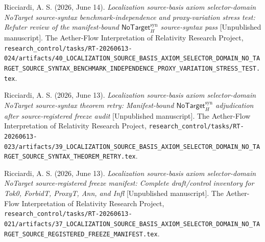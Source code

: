 \documentclass[11pt]{article}
\newcommand{\NoTargetSyn}{\mathsf{NoTarget}_{H}^{\mathrm{syn}}}
\begin{document}
Ricciardi, A. S. (2026, June 14). \emph{Localization source-basis axiom
selector-domain NoTarget source-syntax benchmark-independence and
proxy-variation stress test: Refuter review of the manifest-bound
\(\NoTargetSyn\) source-syntax pass} [Unpublished manuscript]. The
Aether-Flow Interpretation of Relativity Research Project,
\texttt{research\_control/tasks/RT-20260613-024/artifacts/40\_LOCALIZATION\_SOURCE\_BASIS\_AXIOM\_SELECTOR\_DOMAIN\_NO\_TARGET\_SOURCE\_SYNTAX\_BENCHMARK\_INDEPENDENCE\_PROXY\_VARIATION\_STRESS\_TEST.tex}.

Ricciardi, A. S. (2026, June 13). \emph{Localization source-basis axiom
selector-domain NoTarget source-syntax theorem retry: Manifest-bound
\(\NoTargetSyn\) adjudication after source-registered freeze audit}
[Unpublished manuscript]. The Aether-Flow Interpretation of Relativity
Research Project,
\texttt{research\_control/tasks/RT-20260613-023/artifacts/39\_LOCALIZATION\_SOURCE\_BASIS\_AXIOM\_SELECTOR\_DOMAIN\_NO\_TARGET\_SOURCE\_SYNTAX\_THEOREM\_RETRY.tex}.

Ricciardi, A. S. (2026, June 13). \emph{Localization source-basis axiom
selector-domain NoTarget source-registered freeze manifest: Complete
draft/control inventory for Tok0, ForbidT, ProxyT, Ann, and Infl}
[Unpublished manuscript]. The Aether-Flow Interpretation of Relativity
Research Project,
\texttt{research\_control/tasks/RT-20260613-021/artifacts/37\_LOCALIZATION\_SOURCE\_BASIS\_AXIOM\_SELECTOR\_DOMAIN\_NO\_TARGET\_SOURCE\_REGISTERED\_FREEZE\_MANIFEST.tex}.
\end{document}
